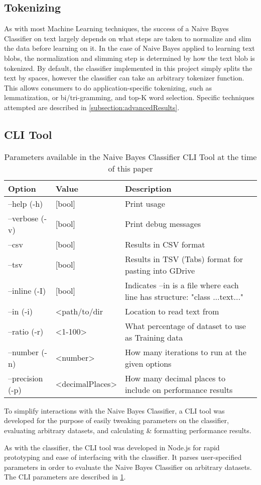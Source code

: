 \subsection{Tokenizing}
\label{subsection:tokenizing}
As with most Machine Learning techniques, the success of a Naive Bayes Classifier on text largely depends on what steps
are taken to normalize and slim the data before learning on it. In the case of Naive Bayes applied to learning text
blobs, the normalization and slimming step is determined by how the text blob is tokenized. By default, the classifier
implemented in this project simply splits the text by spaces, however the classifier can take an arbitrary tokenizer
function. This allows consumers to do application-specific tokenizing, such as lemmatization, or bi/tri-gramming, and
top-K word selection. Specific techniques attempted are described in \ref{subsection:advancedResults}.

\subsection{CLI Tool}
\label{subsection:cliTool}

\begin{table}
    \begin{tabular}{lll}
        \hline
        \textbf{Option} & \textbf{Value} & \textbf{Description} \\ [0.5ex]
        \hline\hline
        --help (-h) & [bool] & Print usage \\
        --verbose (-v) & [bool] & Print debug messages \\
        --csv & [bool] & Results in CSV format \\
        --tsv & [bool] & Results in TSV (Tabs) format for pasting into GDrive \\
        --inline (-I) & [bool] & Indicates --in is a file where each line has structure: "class ...text..." \\
        --in (-i) & <path/to/dir & Location to read text from \\
        --ratio (-r) & <1-100> & What percentage of dataset to use as Training data \\
        --number (-n) & <number> & How many iterations to run at the given options \\
        --precision (-p) & <decimalPlaces> & How many decimal places to include on performance results \\
        \hline
    \end{tabular}
    \caption{Parameters available in the Naive Bayes Classifier CLI Tool at the time of this paper}
    \label{table:cliParams}
\end{table}

To simplify interactions with the Naive Bayes Classifier, a CLI tool was developed for the purpose of easily tweaking
parameters on the classifier, evaluating arbitrary datasets, and calculating \& formatting performance results.

As with the classifier, the CLI tool was developed in Node.js for rapid prototyping and ease of interfacing with the
classifier. It parses user-specified parameters in order to evaluate the Naive Bayes Classifier on arbitrary datasets.
The CLI parameters are described in \ref{table:cliParams}.
